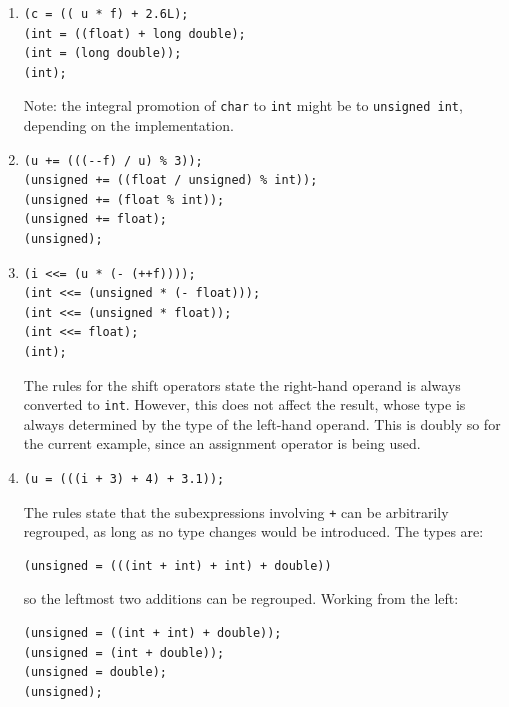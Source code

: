    \begin{enumerate}

    \item 
     \begin{Verbatim}
(c = (( u * f) + 2.6L);
(int = ((float) + long double);
(int = (long double));
(int);
\end{Verbatim}

     Note: the integral promotion of \texttt{char} to \texttt{int}
      might be to \texttt{unsigned int}, depending on the
      implementation.


    

    \item 
     \begin{Verbatim}
(u += (((--f) / u) % 3));
(unsigned += ((float / unsigned) % int));
(unsigned += (float % int));
(unsigned += float);
(unsigned);
\end{Verbatim}

    

    \item 
     \begin{Verbatim}
(i <<= (u * (- (++f))));
(int <<= (unsigned * (- float)));
(int <<= (unsigned * float));
(int <<= float);
(int);
\end{Verbatim}

     The rules for the shift operators state the right-hand operand is
      always converted to \texttt{int}. However, this does not affect the
      result, whose type is always determined by the type of the left-hand
      operand. This is doubly so for the current example, since an assignment
      operator is being used.


    

    \item 
     \begin{Verbatim}
(u = (((i + 3) + 4) + 3.1));
\end{Verbatim}

     The rules state that the subexpressions involving \texttt{+} can be
      arbitrarily regrouped, as long as no type changes would be introduced.
      The types are:


     \begin{Verbatim}
(unsigned = (((int + int) + int) + double))
\end{Verbatim}

     so the leftmost two additions can be regrouped. Working from the
      left:


     \begin{Verbatim}
(unsigned = ((int + int) + double));
(unsigned = (int + double));
(unsigned = double);
(unsigned);
\end{Verbatim}


\end{enumerate}

